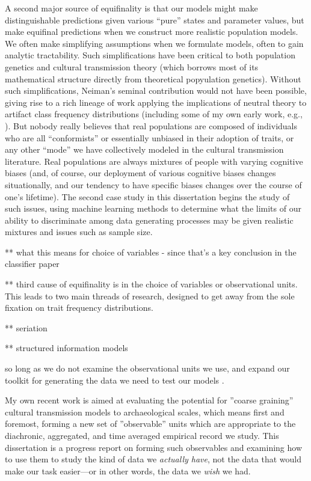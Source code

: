 A second major source of equifinality is that our models might make distinguishable predictions given various ``pure'' states and parameter values, but make equifinal predictions when we construct more realistic population models.  We often make simplifying assumptions when we formulate models, often to gain analytic tractability.  Such simplifications have been critical to both population genetics and cultural transmission theory (which borrows most of its mathematical structure directly from theoretical popyulation genetics).  Without such simplifications, Neiman's \citeyearpar{Neiman1995} seminal contribution would not have been possible, giving rise to a rich lineage of work applying the implications of neutral theory to artifact class frequency distributions (including some of my own early work, e.g., \citealp{Lipo1997}).  But nobody really believes that real populations are composed of individuals who are all ``conformists'' or essentially unbiased in their adoption of traits, or any other ``mode'' we have collectively modeled in the cultural transmission literature.  Real populations are always mixtures of people with varying cognitive biases (and, of course, our deployment of various cognitive biases changes situationally, and our tendency to have specific biases changes over the course of one's lifetime).  The second case study in this dissertation begins the study of such issues, using machine learning methods to determine what the limits of our ability to discriminate among data generating processes may be given realistic mixtures and issues such as sample size.  


** what this means for choice of variables - since that's a key conclusion in the classifier paper

** third cause of equifinality is in the choice of variables or observational units.  This leads to two main threads of research, designed to get away from the sole fixation on trait frequency distributions.  

** seriation

** structured information models  




so long as we do not examine the observational units we use, and expand our toolkit for generating the data we need to test our models \citep{tostevin2019content}.  



My own recent work is aimed at evaluating the potential for ''coarse graining'' cultural transmission models to archaeological scales, which means first and foremost, forming a new set of ''observable'' units which are appropriate to the diachronic, aggregated, and time averaged empirical record we study.  This dissertation is a progress report on forming such observables and examining how to use them to study the kind of data we \emph{actually have}, not the data that would make our task easier---or in other words, the data we \emph{wish} we had. 







